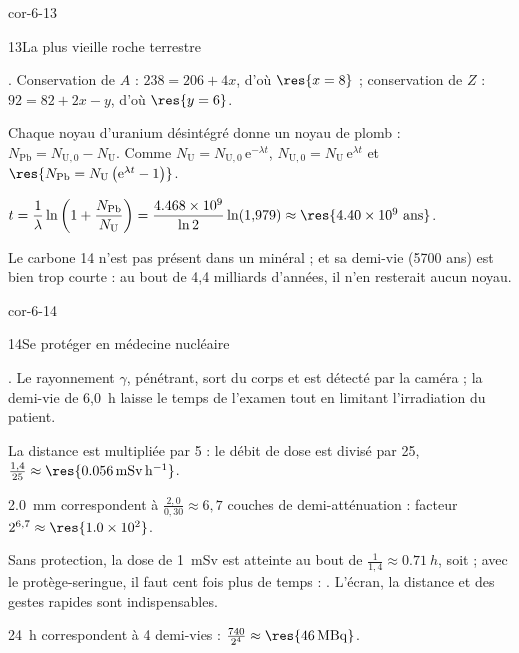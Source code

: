 \begin{blocLivre}{cor-6-13}
\begin{corrige}{13}{La plus vieille roche terrestre}
\begin{questions}
\item {}. Conservation de $A$ : $238=206+4x$, d'où
$\res{x=8}$ ; conservation de $Z$ : $92=82+2x-y$, d'où $\res{y=6}$.
\item Chaque noyau d'uranium désintégré donne un noyau de plomb : $N_\mathrm{Pb}=N_{\mathrm{U},0}-N_\mathrm{U}$. Comme
$N_\mathrm{U}=N_{\mathrm{U},0}\,\mathrm{e}^{-\lambda t}$, $N_{\mathrm{U},0}=N_\mathrm{U}\,\mathrm{e}^{\lambda t}$ et
$\res{N_\mathrm{Pb}=N_\mathrm{U}\left(\mathrm{e}^{\lambda t}-1\right)}$.
\item $t=\dfrac{1}{\lambda}\ln\left(1+\dfrac{N_\mathrm{Pb}}{N_\mathrm{U}}\right)=\dfrac{\num{4.468e9}}{\ln2}\ln(1{,}979)\approx\res{\num{4.40e9}\text{ ans}}$.
\item Le carbone 14 n'est pas présent dans un minéral ; et sa demi-vie (\num{5700} ans) est bien trop courte : au bout de
4,4 milliards d'années, il n'en resterait aucun noyau.
\end{questions}
\end{corrige}
\end{blocLivre}
\begin{blocLivre}{cor-6-14}
\begin{corrige}{14}{Se protéger en médecine nucléaire}
\begin{questions}
\item {}. Le rayonnement $\gamma$, pénétrant, sort du corps et est détecté
par la caméra ; la demi-vie de 6,0~h laisse le temps de l'examen tout en limitant l'irradiation du patient.
\item La distance est multipliée par 5 : le débit de dose est divisé par 25, $\frac{1{,}4}{25}\approx\res{\qty{0,056}{mSv.h^{-1}}}$.
\item \qty{2,0}{mm} correspondent à $\frac{2{,}0}{0{,}30}\approx6{,}7$ couches de demi-atténuation : facteur
$2^{6{,}7}\approx\res{\num{1.0e2}}$.
\item Sans protection, la dose de 1~mSv est atteinte au bout de $\frac{1}{1{,}4}\approx\qty{0,71}{h}$, soit
 ; avec le protège-seringue, il faut cent fois plus de temps : . L'écran, la
distance et des gestes rapides sont indispensables.
\item 24~h correspondent à 4 demi-vies : $\frac{740}{2^4}\approx\res{\qty{46}{MBq}}$.
\end{questions}
\end{corrige}
\end{blocLivre}
